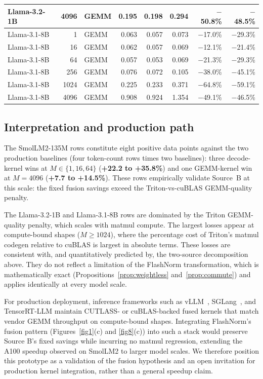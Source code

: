 \documentclass{article}
\begin{document}
\begin{table}[h!]
\begin{tabular}{l r l r r r r r}
Llama-3.2-1B & 4096 & GEMM   & 0.195 & 0.198 & 0.294 & $-$50.8\% & $-$48.5\% \\
\hline
Llama-3.1-8B & 1    & GEMM   & 0.063 & 0.057 & 0.073 & $-$17.0\% & $-$29.3\% \\
Llama-3.1-8B & 16   & GEMM   & 0.062 & 0.057 & 0.069 & $-$12.1\% & $-$21.4\% \\
Llama-3.1-8B & 64   & GEMM   & 0.057 & 0.053 & 0.069 & $-$21.3\% & $-$29.3\% \\
Llama-3.1-8B & 256  & GEMM   & 0.076 & 0.072 & 0.105 & $-$38.0\% & $-$45.1\% \\
Llama-3.1-8B & 1024 & GEMM   & 0.225 & 0.233 & 0.371 & $-$64.8\% & $-$59.1\% \\
Llama-3.1-8B & 4096 & GEMM   & 0.908 & 0.924 & 1.354 & $-$49.1\% & $-$46.5\% \\
\hline
\end{tabular}
\end{table}

\subsection{Interpretation and production path}

The SmolLM2-135M rows constitute eight positive data points against the two production baselines (four token-count rows times two baselines): three decode-kernel wins at $M \in \{1, 16, 64\}$ (\textbf{+22.2 to +35.8\%}) and one GEMM-kernel win at $M{=}4096$ (\textbf{+7.7 to +14.5\%}). These rows empirically validate Source~B at this scale: the fixed fusion savings exceed the Triton-vs-cuBLAS GEMM-quality penalty.

The Llama-3.2-1B and Llama-3.1-8B rows are dominated by the Triton GEMM-quality penalty, which scales with matmul compute. The largest losses appear at compute-bound shapes ($M \geq 1024$), where the percentage cost of Triton's matmul codegen relative to cuBLAS is largest in absolute terms. These losses are consistent with, and quantitatively predicted by, the two-source decomposition above. They do not reflect a limitation of the FlashNorm transformation, which is mathematically exact (Propositions~\ref{prop:weightless} and~\ref{prop:commute}) and applies identically at every model scale.

For production deployment, inference frameworks such as vLLM~\citep{vLLM}, SGLang~\citep{sglang}, and TensorRT-LLM maintain CUTLASS- or cuBLAS-backed fused kernels that match vendor GEMM throughput on compute-bound shapes. Integrating FlashNorm's fusion pattern (Figures~\ref{fig1}(c) and \ref{fig8}(c)) into such a stack would preserve Source B's fixed savings while incurring no matmul regression, extending the A100 speedup observed on SmolLM2 to larger model scales. We therefore position this prototype as a validation of the fusion hypothesis and an open invitation for production kernel integration, rather than a general speedup claim.
\end{document}
